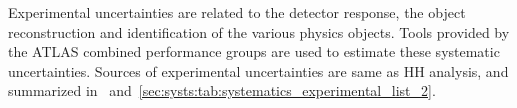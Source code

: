 Experimental uncertainties are related to the detector response, the object reconstruction and identification of the various physics objects.
Tools provided by the ATLAS combined performance groups are used to estimate these systematic uncertainties. 
Sources of experimental uncertainties are same as HH analysis, and summarized in~ and~\ref{sec:systs:tab:systematics_experimental_list_2}.
